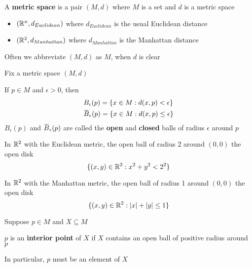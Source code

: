 \documentclass[11pt]{article}
\begin{document}
\begin{definition}[]
A \textbf{metric space} is a pair \((M,d)\) where \(M\) is a set and \(d\) is a metric space
\end{definition}

\begin{itemize}
\item \((\mathbb{R}^n,d_{Euclidean})\) where \(d_{Euclidean}\) is the usual Euclidean distance
\item \((\mathbb{R}^2,d_{Manhattan})\) where \(d_{Manhattan}\) is the Manhattan distance
\end{itemize}


Often we abbreviate \((M,d)\) as \(M\), when \(d\) is clear

Fix a metric space \((M,d)\)

\begin{definition}[]
If \(p\in M\) and \(\epsilon>0\), then
\begin{align*}
&B_\epsilon(p)=\{x\in M:d(x,p)<\epsilon\}\\
&\barB_\epsilon(p)=\{x\in M:d(x,p)\le\epsilon\}\\
\end{align*}
\(B_\epsilon(p)\) and \(\barB_\epsilon(p)\) are called the \textbf{open} and \textbf{closed} balls of radius \(\epsilon\) around \(p\)
\end{definition}

\begin{examplle}[]
In \(\mathbb{R}^2\) with the Euclidean metric, the open ball of radius 2 around \((0,0)\) the open disk
\begin{equation*}
\{(x,y)\in\mathbb{R}^2:x^2+y^2<2^2\}
\end{equation*}
\end{examplle}

\begin{examplle}[]
In \(\mathbb{R}^2\) with the Manhattan metric, the open ball of radius 1 around \((0,0)\) the open disk
\begin{equation*}
\{(x,y)\in\R^2:\abs{x}+\abs{y}\le 1\}
\end{equation*}
\end{examplle}

Suppose \(p\in M\) and \(X\subseteq M\)
\begin{definition}[]
\(p\) is an \textbf{interior point} of \(X\) if \(X\) contains an open ball of positive radius around \(p\)
\end{definition}

In particular, \(p\) must be an element of \(X\)
\end{document}
